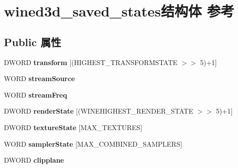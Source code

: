 \hypertarget{structwined3d__saved__states}{}\section{wined3d\+\_\+saved\+\_\+states结构体 参考}
\label{structwined3d__saved__states}
\subsection*{Public 属性}
\begin{DoxyCompactItemize}
\item 
\mbox{\label{structwined3d__saved__states_a99074b9bc6dcfe0b1c7df2806122183d}} 
D\+W\+O\+RD {\bfseries transform} \mbox{[}(H\+I\+G\+H\+E\+S\+T\+\_\+\+T\+R\+A\+N\+S\+F\+O\+R\+M\+S\+T\+A\+TE $>$$>$ 5)+1\mbox{]}
\item 
\mbox{\label{structwined3d__saved__states_a9fa3043edc26e8fab1dcd7d0b3e3a337}} 
W\+O\+RD {\bfseries stream\+Source}
\item 
\mbox{\label{structwined3d__saved__states_a75ce5e8c3b2a74aaa5fb0f81a6ceb71d}} 
W\+O\+RD {\bfseries stream\+Freq}
\item 
\mbox{\label{structwined3d__saved__states_a2a201b5b5c63ca37410b053f9c1300ba}} 
D\+W\+O\+RD {\bfseries render\+State} \mbox{[}(W\+I\+N\+E\+H\+I\+G\+H\+E\+S\+T\+\_\+\+R\+E\+N\+D\+E\+R\+\_\+\+S\+T\+A\+TE $>$$>$ 5)+1\mbox{]}
\item 
\mbox{\label{structwined3d__saved__states_a332e594f1377e06717e77f568ed2c83e}} 
D\+W\+O\+RD {\bfseries texture\+State} \mbox{[}M\+A\+X\+\_\+\+T\+E\+X\+T\+U\+R\+ES\mbox{]}
\item 
\mbox{\label{structwined3d__saved__states_a9c44400c40981a5874c204ff4d71c4a2}} 
W\+O\+RD {\bfseries sampler\+State} \mbox{[}M\+A\+X\+\_\+\+C\+O\+M\+B\+I\+N\+E\+D\+\_\+\+S\+A\+M\+P\+L\+E\+RS\mbox{]}
\item 
\mbox{\label{structwined3d__saved__states_a58be59f9ed76fdcc6b14d54959cf91df}} 
D\+W\+O\+RD {\bfseries clipplane}

\end{DoxyCompactItemize}
